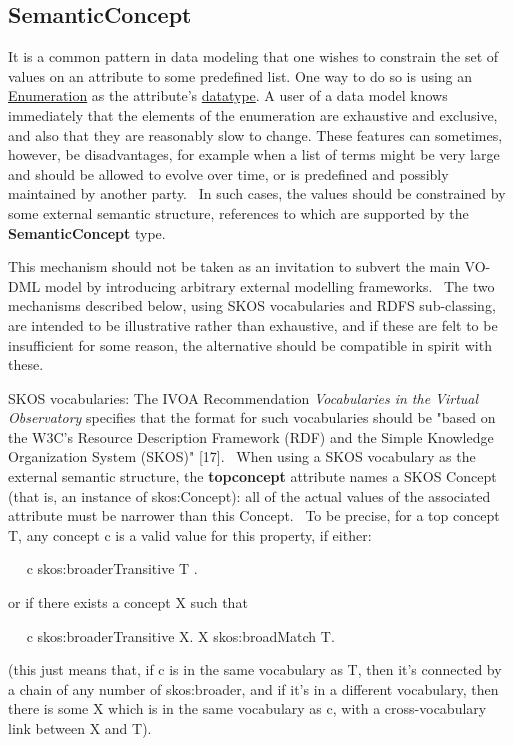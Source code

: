 \documentclass[10pt,a4paper]{ivoa}
\begin{document}
\hypertarget{semanticconcept}{%
\subsection{SemanticConcept}\label{semanticconcept}}

It is a common pattern in data modeling that one wishes to constrain the
set of values on an attribute to some predefined list. One way to do so
is using an
\protect\hyperlink{enumeration-extends-valuetype}{Enumeration} as the
attribute's \protect\hyperlink{datatype-elementref}{datatype}. A user of
a data model knows immediately that the elements of the enumeration are
exhaustive and exclusive, and also that they are reasonably slow to
change. These features can sometimes, however, be disadvantages, for
example when a list of terms might be very large and should be allowed
to evolve over time, or is predefined and possibly maintained by another
party.~ In such cases, the values should be constrained by some external
semantic structure, references to which are supported by the
\textbf{SemanticConcept} type.

This mechanism should not be taken as an invitation to subvert the main
VO-DML model by introducing arbitrary external modelling frameworks.~
The two mechanisms described below, using SKOS vocabularies and RDFS
sub-classing, are intended to be illustrative rather than exhaustive,
and if these are felt to be insufficient for some reason, the
alternative should be compatible in spirit with these.

SKOS vocabularies: The IVOA Recommendation \emph{Vocabularies in the
Virtual Observatory} specifies that the format for such vocabularies
should be "based on the W3C's Resource Description Framework (RDF) and
the Simple Knowledge Organization System (SKOS)" {[}17{]}.~ When using a
SKOS vocabulary as the external semantic structure, the
\textbf{topconcept} attribute names a SKOS Concept (that is, an instance
of skos:Concept): all of the actual values of the associated attribute
must be narrower than this Concept.~ To be precise, for a top concept T,
any concept c is a valid value for this property, if either:

~~ c skos:broaderTransitive T .

or if there exists a concept X such that

~~ c skos:broaderTransitive X. X skos:broadMatch T.

(this just means that, if c is in the same vocabulary as T, then it's
connected by a chain of any number of skos:broader, and if it's in a
different vocabulary, then there is some X which is in the same
vocabulary as c, with a cross-vocabulary link between X and T).
\end{document}
